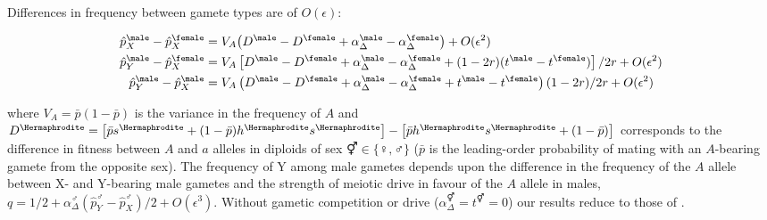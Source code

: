 \documentclass[12pt]{article}
\begin{document}
\noindent
Differences in frequency between gamete types are of $O(\epsilon)$:

\begin{equation}
\begin{split}
\hat{p}^\male_X-\hat{p}^\female_X&=V_{A}\big{(}D^\male - D^\female +\alpha_{\Delta}^\male-\alpha_{\Delta}^\female \big{)}
+O(\epsilon^2)\\
%
\hat{p}^\male_Y-\hat{p}^\female_X&=V_{A}\left[D^\male - D^\female+\alpha_{\Delta}^\male-\alpha_{\Delta}^\female+(1-2r)(t^\male-t^\female)\right]/2r
+O(\epsilon^2)\\
%
\hat{p}^\male_Y-\hat{p}^\male_X&=V_{A}\left(D^\male - D^\female+\alpha_{\Delta}^\male-\alpha_{\Delta}^\female+t^\male-t^\female\right)(1-2r)/2r
+O(\epsilon^2)
\end{split}
\label{eq:freq_diffs}
\end{equation}

\noindent
where $V_{A}=\bar{p}(1-\bar{p})$ is the variance in the frequency of $A$ and $D^\Hermaphrodite=\big{[} \bar{p}s^\Hermaphrodite+(1-\bar{p})h^\Hermaphrodite s^\Hermaphrodite\big{]} -\big{[} \bar{p}h^\Hermaphrodite s^\Hermaphrodite+(1-\bar{p}) \big{]}$ corresponds to the difference in fitness between $A$ and $a$ alleles in diploids of sex $\Hermaphrodite \in \{\female,\male\}$ ($\bar{p}$ is the leading-order probability of mating with an $A$-bearing gamete from the opposite sex). 
The frequency of Y among male gametes depends upon the difference in the frequency of the $A$ allele between X- and Y-bearing male gametes and the strength of meiotic drive in favour of the $A$ allele in males, $q=1/2+\alpha_{\Delta}^\male(\hat{p}^\male_Y-\hat{p}^\male_X)/2+O(\epsilon^3)$.
Without gametic competition or drive ($\alpha_{\Delta}^\Hermaphrodite=t^\Hermaphrodite=0$) our results reduce to those of \citet{vanDoorn:2007eu}.

\end{document}

